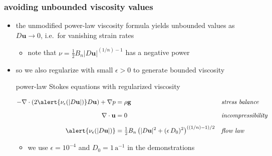 \documentclass[10pt,
               hyperref={colorlinks,citecolor=DeepPink4,linkcolor=black,urlcolor=blue},
               svgnames]{beamer}
\newcommand{\bg}{\mathbf{g}}
\newcommand{\bu}{\mathbf{u}}
\newcommand{\Div}{\nabla\cdot}
\newcommand{\eps}{\epsilon}
\newcommand{\detailreturn}[1]{\hfill \hyperlink{#1}{\beamerreturnbutton{return}}}
\begin{document}
\appendix  %

\begin{frame}[label=regularized]
\frametitle{avoiding unbounded viscosity values}

\begin{itemize}
\item the unmodified power-law viscosity formula yields unbounded values as $D\bu\to 0$, i.e.~for vanishing strain rates
    \begin{itemize}
    \item[$\circ$] note that $\nu = \frac{1}{2} B_n |D\bu|^{(1/n) - 1}$ has a negative power
    \end{itemize}
\item so we also regularize with \alert{small $\eps>0$} to generate bounded viscosity

\begin{block}{power-law Stokes equations with regularized viscosity}

\begin{align*}
- \Div \left(2 \alert{\nu_\eps(|D\bu|)} D\bu\right) + \nabla p &= \rho \bg &&\text{\emph{stress balance}} \\
\phantom{\int} \Div \bu &= 0 &&\text{\emph{incompressibility}} \\
\alert{\nu_\eps(|D\bu|)} &= \tfrac{1}{2} B_n \left(|D\bu|^2 + (\eps\, D_0)^2\right)^{((1/n) - 1)/2} &&\text{\emph{flow law}}
\end{align*}

\smallskip
\end{block}

    \begin{itemize}
    \item[$\circ$] we use $\eps = 10^{-4}$ and $D_0 = 1\,\text{a}^{-1}$ in the demonstrations
    \end{itemize}
\end{itemize}

\detailreturn{stokeseqns}
\end{frame}
\end{document}
